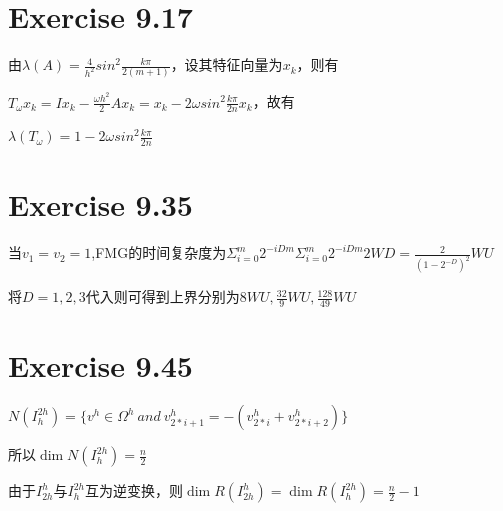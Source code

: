 \documentclass{article}
\begin{document}
\section{Exercise 9.17}
由$\lambda(A)=\frac{4}{h^2}sin^2\frac{k\pi}{2(m+1)}$，设其特征向量为$x_k$，则有

$T_\omega x_k=Ix_k-\frac{\omega h^2}{2}Ax_k=x_k-2\omega sin^2\frac{k\pi}{2n}x_k$，故有

$\lambda(T_\omega)=1-2\omega sin^2\frac{k\pi}{2n}$

\section{Exercise 9.35}

当$v_1=v_2=1$,FMG的时间复杂度为$\Sigma_{i=0}^m2^{-iDm}\Sigma_{i=0}^m2^{-iDm}2WD=\frac{2}{(1-2^{-D})^2}WU$

将$D=1,2,3$代入则可得到上界分别为$8WU,\frac{32}{9}WU,\frac{128}{49}WU$

\section{Exercise 9.45}

$N(I_h^{2h})=\{v^h \in \Omega^h\ and \ v^h_{2*i+1}=-(v^h_{2*i}+v^h_{2*i+2})\}$

所以$\dim N(I_h^{2h})=\frac{n}{2}$

由于$I^h_{2h}$与$I_h^{2h}$互为逆变换，则$\dim R(I^h_{2h})=\dim R(I_h^{2h})=\frac{n}{2}-1$
\end{document}
